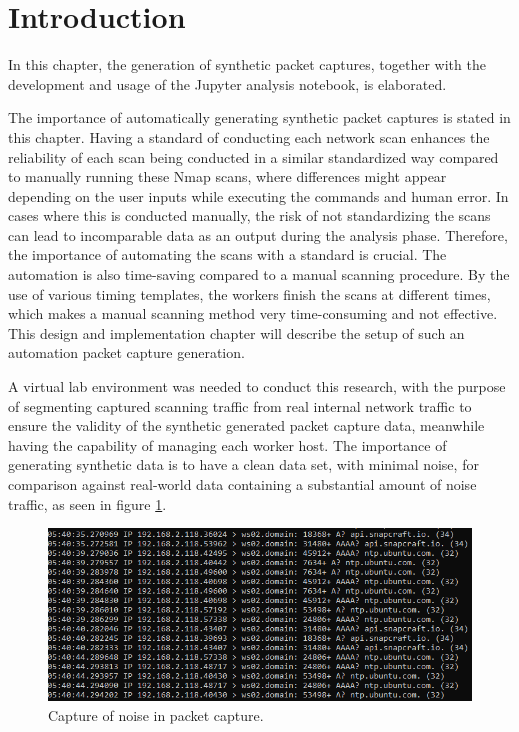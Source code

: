 \section{Introduction}
\label{s:DataGAIntroduction}
In this chapter, the generation of synthetic packet captures, together with the development and usage of the Jupyter analysis notebook, is elaborated.

The importance of automatically generating synthetic packet captures is stated in this chapter.
Having a standard of conducting each network scan enhances the reliability of each scan being conducted in a similar standardized way compared to manually running these Nmap scans, where differences might appear depending on the user inputs while executing the commands and human error.
In cases where this is conducted manually, the risk of not standardizing the scans can lead to incomparable data as an output during the analysis phase.
Therefore, the importance of automating the scans with a standard is crucial. The automation is also time-saving compared to a manual scanning procedure.
By the use of various timing templates, the workers finish the scans at different times, which makes a manual scanning method very time-consuming and not effective. This design and implementation chapter will describe the setup of such an automation packet capture generation.

A virtual lab environment was needed to conduct this research, with the purpose of segmenting captured scanning traffic from real internal network traffic to ensure the validity of the synthetic generated packet capture data, meanwhile having the capability of managing each worker host.
The importance of generating synthetic data is to have a clean data set, with minimal noise, for comparison against real-world data containing a substantial amount of noise traffic, as seen in figure \ref{fig:NoisePcap}.


\begin{figure}[htbp]
\centerline{\includegraphics[scale=0.7]{images/misc/NoiseData.PNG}}
\caption{Capture of noise in packet capture.}
\label{fig:NoisePcap}
\end{figure}